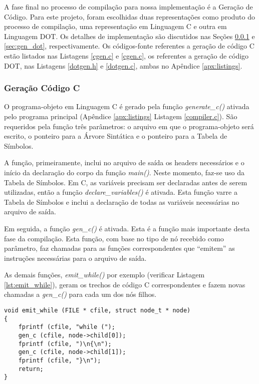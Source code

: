 A fase final no processo de compilação para nossa implementação é a Geração de
Código. Para este projeto, foram escolhidas duas representações como produto
do processo de compilação, uma representação em Linguagem C e outra em
Linguagem DOT. Os detalhes de implementação são discutidos nas Seções
\ref{sec:gen_c} e \ref{sec:gen_dot}, respectivamente. Os códigos-fonte
referentes a geração de código C estão listados nas Listagens \ref{cgen.c}
e \ref{cgen.c}, os referentes a geração de código DOT, nas Listagens
\ref{dotgen.h} e \ref{dotgen.c}, ambas no Apêndice \ref{apx:listings}.


\subsubsection{Geração Código C}
\label{sec:gen_c}
O programa-objeto em Linguagem C é gerado pela função \emph{generate\_c()}
ativada pelo programa principal (Apêndice \ref{apx:listings} Listagem
\ref{compiler.c}). São requeridos pela função três parâmetros: o arquivo em
que o programa-objeto será escrito, o ponteiro para a Árvore Sintática e o
ponteiro para a Tabela de Símbolos.

A função, primeiramente, inclui no arquivo de saída os headers necessários e
o início da declaração do corpo da função \emph{main()}. Neste momento, faz-se
uso da Tabela de Símbolos. Em C, as variáveis precisam ser declaradas antes de
serem utilizadas, então a função \emph{declare\_variables()} é ativada. Esta
função varre a Tabela de Símbolos e inclui a declaração de todas as variáveis
necessárias no arquivo de saída.

Em seguida, a função \emph{gen\_c()} é ativada. Esta é a função mais
importante desta fase da compilação. Esta função, com base no tipo de nó
recebido como parâmetro, faz chamadas para as funções correspondentes que
``emitem'' as instruções necessárias para o arquivo de saída.

As demais funções, \emph{emit\_while()} por exemplo (verificar Listagem
\ref{lst:emit_while}), geram os trechos de código C correspondentes e fazem novas
chamadas a \emph{gen\_c()} para cada um dos nós filhos.

\begin{lstlisting}[label=lst:emit_while,caption=Função geradora do comando
while em C]
void emit_while (FILE * cfile, struct node_t * node)
{
	fprintf (cfile, "while (");
	gen_c (cfile, node->child[0]);
	fprintf (cfile, ")\n{\n");
	gen_c (cfile, node->child[1]);
	fprintf (cfile, "}\n");
	return;
}
\end{lstlisting}

